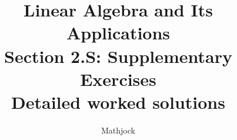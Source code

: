 
\title{\textbf{Linear Algebra and Its Applications}\\[0.3em]Section 2.S: Supplementary Exercises\\[0.3em]\large Detailed worked solutions}
\author{Mathjock}
\date{}

\maketitle
\bookinfo
\tableofcontents
\clearpage
\renewcommand{\thesection}{2.S}
\renewcommand{\theHsection}{2.S}
\setcounter{section}{0}


